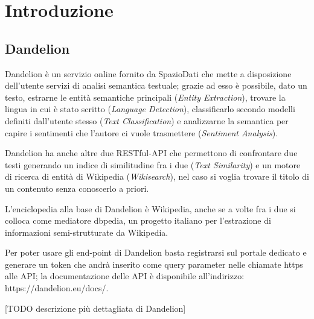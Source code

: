 
\chapter{Introduzione}
\section{Dandelion}

Dandelion è un servizio online fornito da SpazioDati che mette a disposizione dell'utente servizi di analisi semantica testuale; 
grazie ad esso è possibile, dato un testo, estrarne le entità semantiche principali (\textit{Entity Extraction}), trovare la lingua in cui è stato 
scritto (\textit{Language Detection}), classificarlo secondo modelli definiti dall'utente stesso (\textit{Text Classification}) e analizzarne la semantica 
per capire i sentimenti che l'autore ci vuole trasmettere (\textit{Sentiment Analysis}). 

Dandelion ha anche altre due RESTful-API che permettono di confrontare due testi generando un indice di similitudine fra i due (\textit{Text Similarity}) e
un motore di ricerca di entità di Wikipedia (\textit{Wikisearch}), nel caso si voglia trovare il titolo di un contenuto senza conoscerlo a priori.

L'enciclopedia alla base di Dandelion è Wikipedia, anche se a volte fra i due si colloca come mediatore dbpedia, un progetto italiano per l'estrazione di 
informazioni semi-strutturate da Wikipedia. 

Per poter usare gli end-point di Dandelion basta registrarsi sul portale dedicato e generare un token che andrà inserito come query parameter nelle chiamate https alle API;
la documentazione delle API è disponibile all'indirizzo: https://dandelion.eu/docs/.

[TODO descrizione più dettagliata di Dandelion]

